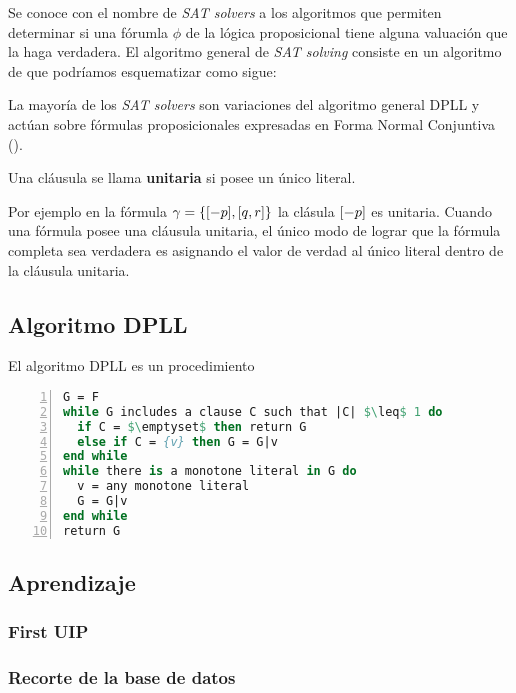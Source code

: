 Se conoce con el nombre de \emph{SAT solvers} a los algoritmos que permiten
determinar si una fórumla $\phi$ de la lógica proposicional tiene alguna
valuación que la haga verdadera. El algoritmo general de  \emph{SAT solving}
consiste en un algoritmo de \bt que podríamos esquematizar como sigue:


La mayoría de los \emph{SAT solvers} son
variaciones del algoritmo general
DPLL\cite{Davis:1962:MPT:368273.368557} y actúan sobre fórmulas
proposicionales expresadas en Forma Normal Conjuntiva (\cnf).



\begin{definition} 
 Una cláusula se llama \textbf{unitaria} si
posee un único literal.
\end{definition}
Por ejemplo
en la fórmula $\gamma = \{[-p], [q, r]\}$ la clásula $[-p]$ es
unitaria. Cuando una fórmula \cnf posee una cláusula unitaria, el único modo de
lograr que la fórmula completa sea verdadera es asignando el valor de verdad
\true al único literal dentro de la cláusula unitaria.

\subsection{Algoritmo DPLL}

El algoritmo DPLL es un procedimiento 

\begin{lstlisting}[mathescape,language=Pascal,frame=single,numbers=left,caption={Algoritmo
DPLL}] G = F
while G includes a clause C such that |C| $\leq$ 1 do
  if C = $\emptyset$ then return G
  else if C = {v} then G = G|v
end while
while there is a monotone literal in G do
  v = any monotone literal
  G = G|v
end while
return G
\end{lstlisting}

\subsection{Aprendizaje}
\subsubsection{First UIP}
\subsubsection{Recorte de la base de datos}
